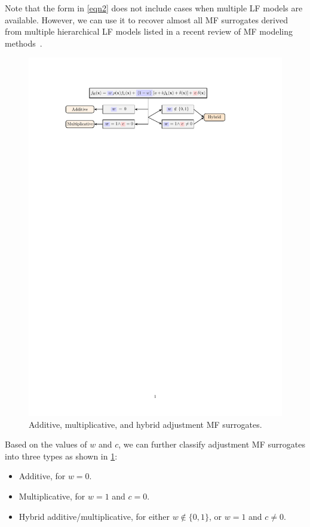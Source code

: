 \documentclass[journal ]{new-aiaa}
\begin{document}
	Note that the form in \cref{eqn2} does not include cases when multiple LF models are available.
	However, we can use it to recover almost all MF surrogates derived from multiple hierarchical LF models listed in a recent review of MF modeling methods~\citep{FernandezGodino2016}.
	
	\begin{figure}
		\centering
		\includegraphics[scale=0.9]{Fig3.pdf}
		\caption{Additive, multiplicative, and hybrid adjustment MF surrogates.}
		\label{Fig-3}
	\end{figure}
	
	Based on the values of $w$ and $c$, we can further classify adjustment MF surrogates into three types as shown in \cref{Fig-3}:
	\begin{itemize}
		\item Additive, for $w=0$.
		
		\item Multiplicative, for $w=1$ and $c=0$.
		
		\item Hybrid additive/multiplicative, for either $w \notin \{0,1\}$, or $w=1$ and $c \neq 0$.
	\end{itemize}
	
\end{document}
